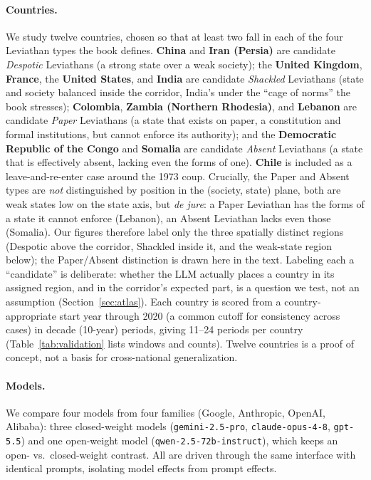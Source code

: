 \documentclass[twocolumn,10pt]{article}
\begin{document}
\paragraph{Countries.} We study twelve countries, chosen so that at least two
fall in each of the four Leviathan types the book defines. \textbf{China} and
\textbf{Iran (Persia)} are candidate
\emph{Despotic} Leviathans (a strong state over a weak society); the
\textbf{United Kingdom}, \textbf{France}, the \textbf{United States}, and
\textbf{India} are candidate \emph{Shackled} Leviathans (state and society
balanced inside the corridor, India's under the ``cage of norms'' the book
stresses); \textbf{Colombia}, \textbf{Zambia (Northern Rhodesia)}, and
\textbf{Lebanon} are candidate \emph{Paper} Leviathans (a state that exists on
paper, a constitution and formal institutions, but cannot enforce its authority);
and the \textbf{Democratic Republic of the Congo} and \textbf{Somalia} are
candidate \emph{Absent} Leviathans (a state that is effectively absent, lacking
even the forms of one). \textbf{Chile} is included as a leave-and-re-enter case
around the 1973 coup. Crucially, the Paper and Absent types are \emph{not}
distinguished by position in the (society, state) plane, both are weak states low
on the state axis, but \emph{de jure}: a Paper Leviathan has the forms of a state
it cannot enforce (Lebanon), an Absent Leviathan lacks even those (Somalia). Our
figures therefore label only the three spatially distinct regions (Despotic
above the corridor, Shackled inside it, and the weak-state region below); the
Paper/Absent distinction is drawn here in the text. Labeling each a
``candidate'' is deliberate: whether the LLM actually places a country in its
assigned region, and in the corridor's expected part, is a question we test, not
an assumption (Section~\ref{sec:atlas}). Each country is scored from a country-appropriate
start year through 2020 (a common cutoff for consistency across cases) in decade
(10-year) periods, giving 11--24 periods per country
(Table~\ref{tab:validation} lists windows and counts). Twelve countries is a
proof of concept, not a basis for cross-national generalization.

\paragraph{Models.} We compare four models from four families (Google,
Anthropic, OpenAI, Alibaba): three closed-weight models (\texttt{gemini-2.5-pro},
\texttt{claude-opus-4-8}, \texttt{gpt-5.5}) and one open-weight model
(\texttt{qwen-2.5-72b-instruct}), which keeps an open- vs.\ closed-weight
contrast. All are driven through the same interface with identical prompts,
isolating model effects from prompt effects.
\end{document}
